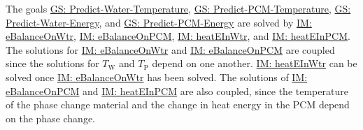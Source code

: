 \documentclass[12pt]{article}
\begin{document}
The goals \hyperref[waterTempGS]{GS: Predict-Water-Temperature}, \hyperref[pcmTempGS]{GS: Predict-PCM-Temperature}, \hyperref[waterEnergyGS]{GS: Predict-Water-Energy}, and \hyperref[pcmEnergyGS]{GS: Predict-PCM-Energy} are solved by \hyperref[IM:eBalanceOnWtr]{IM: eBalanceOnWtr}, \hyperref[IM:eBalanceOnPCM]{IM: eBalanceOnPCM}, \hyperref[IM:heatEInWtr]{IM: heatEInWtr}, and \hyperref[IM:heatEInPCM]{IM: heatEInPCM}. The solutions for \hyperref[IM:eBalanceOnWtr]{IM: eBalanceOnWtr} and \hyperref[IM:eBalanceOnPCM]{IM: eBalanceOnPCM} are coupled since the solutions for ${T_{\text{W}}}$ and ${T_{\text{P}}}$ depend on one another. \hyperref[IM:heatEInWtr]{IM: heatEInWtr} can be solved once \hyperref[IM:eBalanceOnWtr]{IM: eBalanceOnWtr} has been solved. The solutions of \hyperref[IM:eBalanceOnPCM]{IM: eBalanceOnPCM} and \hyperref[IM:heatEInPCM]{IM: heatEInPCM} are also coupled, since the temperature of the phase change material and the change in heat energy in the PCM depend on the phase change.
\end{document}
